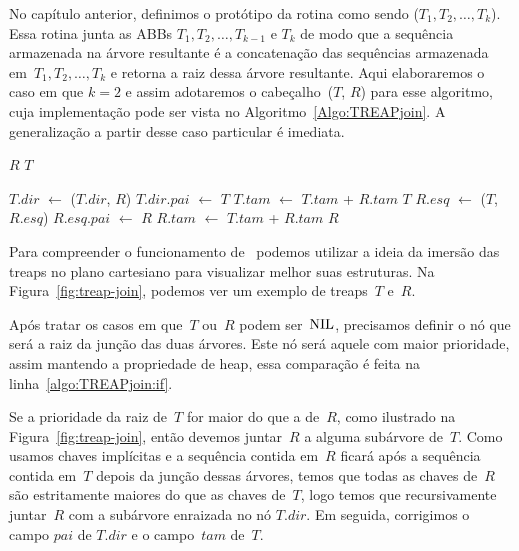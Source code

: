 No capítulo anterior, definimos o protótipo da rotina \treapJoin{} como sendo \treapJoin($T_1, T_2, \ldots, T_k$).
Essa rotina junta as ABBs $T_1, T_2, \ldots, T_{k-1}$ e $T_k$ de modo que a sequência armazenada na árvore resultante é a concatenação das sequências armazenada em~$T_1, T_2, \ldots, T_k$ e retorna a raiz dessa árvore resultante.
Aqui elaboraremos o caso em que $k=2$ e assim adotaremos o cabeçalho~\treapJoin($T$, $R$) para esse algoritmo, cuja implementação pode ser vista no Algoritmo~\ref{Algo:TREAPjoin}.
A generalização a partir desse caso particular é imediata.

\begin{algorithm}
\caption{\treapJoin($T$, $R$)}
\label{Algo:TREAPjoin}
\begin{algorithmic}[1]
 \Return $R$
\EndIf
{} \Return $T$
\EndIf

\label{algo:TREAPjoin:if}
  \State $T$.$dir$ $\gets$ \treapJoin($T$.$dir$, $R$)
  \State $T$.$dir$.$pai$ $\gets$ $T$
  \State $T$.$tam$ $\gets$ $T$.$tam$ + $R$.$tam$
  \State \Return $T$
\Else 
  \State $R$.$esq$ $\gets$ \treapJoin($T$, $R$.$esq$)
  \State $R$.$esq$.$pai$ $\gets$ $R$
  \State $R$.$tam$ $\gets$ $T$.$tam$ + $R$.$tam$
  \State \Return $R$
\EndIf
\end{algorithmic}
\end{algorithm}

Para compreender o funcionamento de~\treapJoin{} podemos utilizar a ideia da imersão das treaps no plano cartesiano para visualizar melhor suas estruturas.
Na Figura~\ref{fig:treap-join}, podemos ver um exemplo de treaps~$T$ e~$R$.

Após tratar os casos em que~$T$ ou~$R$ podem ser~$\text{NIL}$, precisamos definir o nó que será a raiz da junção das duas árvores.
Este nó será aquele com maior prioridade, assim mantendo a propriedade de heap, essa comparação é feita na linha~\ref{algo:TREAPjoin:if}.

Se a prioridade da raiz de~$T$ for maior do que a de~$R$, como ilustrado na Figura~\ref{fig:treap-join}, então devemos juntar~$R$ a alguma subárvore de~$T$.
Como usamos chaves implícitas e a sequência contida em~$R$ ficará após a sequência contida em~$T$ depois da junção dessas árvores,
temos que todas as chaves de~$R$ são estritamente maiores do que as chaves de~$T$, logo temos que recursivamente juntar~$R$ com a subárvore enraizada no nó $T$.$dir$.
Em seguida, corrigimos o campo $pai$ de $T$.$dir$ e o campo~$tam$ de~$T$.


